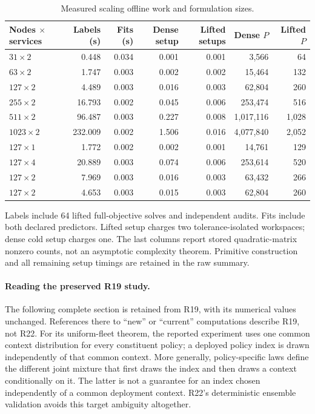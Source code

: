 \documentclass[11pt,letterpaper]{article}
\theoremstyle{definition}
\newcommand{\1}{\mathbf 1}
\begin{document}
\begin{table}[tbp]\centering\small
\caption{Measured scaling offline work and formulation sizes.}\label{tab:r22-setup}
\begin{tabular}{lrrrrrr}
\toprule
Nodes $\times$ services & Labels (s) & Fits (s) & Dense setup & Lifted setups & Dense $P$ & Lifted $P$\\
\midrule
$31\times 2$ & 0.448 & 0.034 & 0.001 & 0.001 & 3,566 & 64\\
$63\times 2$ & 1.747 & 0.003 & 0.002 & 0.002 & 15,464 & 132\\
$127\times 2$ & 4.489 & 0.003 & 0.016 & 0.003 & 62,804 & 260\\
$255\times 2$ & 16.793 & 0.002 & 0.045 & 0.006 & 253,474 & 516\\
$511\times 2$ & 96.487 & 0.003 & 0.227 & 0.008 & 1,017,116 & 1,028\\
$1023\times 2$ & 232.009 & 0.002 & 1.506 & 0.016 & 4,077,840 & 2,052\\
$127\times 1$ & 1.772 & 0.002 & 0.002 & 0.001 & 14,761 & 129\\
$127\times 4$ & 20.889 & 0.003 & 0.074 & 0.006 & 253,614 & 520\\
$127\times 2$ & 7.969 & 0.003 & 0.016 & 0.003 & 63,432 & 266\\
$127\times 2$ & 4.653 & 0.003 & 0.015 & 0.003 & 62,804 & 260\\
\bottomrule
\end{tabular}
\par\smallskip\begin{minipage}{.98\textwidth}\small Labels include 64 lifted full-objective solves and independent audits. Fits include both declared predictors. Lifted setup charges two tolerance-isolated workspaces; dense cold setup charges one. The last columns report stored quadratic-matrix nonzero counts, not an asymptotic complexity theorem. Primitive construction and all remaining setup timings are retained in the raw summary.\end{minipage}
\end{table}



\paragraph{Reading the preserved R19 study.}
The following complete section is retained from R19, with its numerical values unchanged. References there to ``new'' or ``current'' computations describe R19, not R22. For its uniform-fleet theorem, the reported experiment uses one common context distribution for every constituent policy; a deployed policy index is drawn independently of that common context. More generally, policy-specific laws define the different joint mixture that first draws the index and then draws a context conditionally on it. The latter is not a guarantee for an index chosen independently of a common deployment context. R22's deterministic ensemble validation avoids this target ambiguity altogether.
\end{document}

